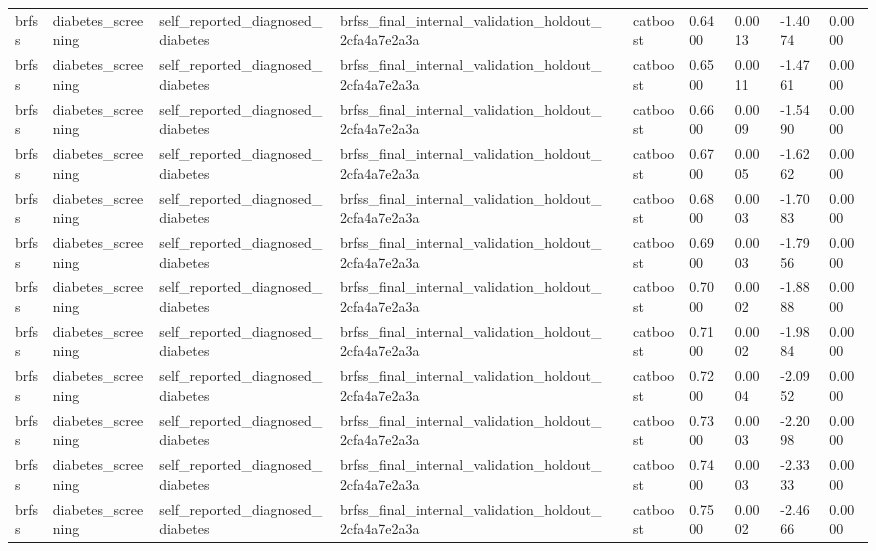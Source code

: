 \begin{tabular}{llllllllll}
brfss & diabetes\_screening & self\_reported\_diagnosed\_diabetes & brfss\_final\_internal\_validation\_holdout\_2cfa4a7e2a3a &  & catboost & 0.6400 & 0.0013 & -1.4074 & 0.0000 \\
brfss & diabetes\_screening & self\_reported\_diagnosed\_diabetes & brfss\_final\_internal\_validation\_holdout\_2cfa4a7e2a3a &  & catboost & 0.6500 & 0.0011 & -1.4761 & 0.0000 \\
brfss & diabetes\_screening & self\_reported\_diagnosed\_diabetes & brfss\_final\_internal\_validation\_holdout\_2cfa4a7e2a3a &  & catboost & 0.6600 & 0.0009 & -1.5490 & 0.0000 \\
brfss & diabetes\_screening & self\_reported\_diagnosed\_diabetes & brfss\_final\_internal\_validation\_holdout\_2cfa4a7e2a3a &  & catboost & 0.6700 & 0.0005 & -1.6262 & 0.0000 \\
brfss & diabetes\_screening & self\_reported\_diagnosed\_diabetes & brfss\_final\_internal\_validation\_holdout\_2cfa4a7e2a3a &  & catboost & 0.6800 & 0.0003 & -1.7083 & 0.0000 \\
brfss & diabetes\_screening & self\_reported\_diagnosed\_diabetes & brfss\_final\_internal\_validation\_holdout\_2cfa4a7e2a3a &  & catboost & 0.6900 & 0.0003 & -1.7956 & 0.0000 \\
brfss & diabetes\_screening & self\_reported\_diagnosed\_diabetes & brfss\_final\_internal\_validation\_holdout\_2cfa4a7e2a3a &  & catboost & 0.7000 & 0.0002 & -1.8888 & 0.0000 \\
brfss & diabetes\_screening & self\_reported\_diagnosed\_diabetes & brfss\_final\_internal\_validation\_holdout\_2cfa4a7e2a3a &  & catboost & 0.7100 & 0.0002 & -1.9884 & 0.0000 \\
brfss & diabetes\_screening & self\_reported\_diagnosed\_diabetes & brfss\_final\_internal\_validation\_holdout\_2cfa4a7e2a3a &  & catboost & 0.7200 & 0.0004 & -2.0952 & 0.0000 \\
brfss & diabetes\_screening & self\_reported\_diagnosed\_diabetes & brfss\_final\_internal\_validation\_holdout\_2cfa4a7e2a3a &  & catboost & 0.7300 & 0.0003 & -2.2098 & 0.0000 \\
brfss & diabetes\_screening & self\_reported\_diagnosed\_diabetes & brfss\_final\_internal\_validation\_holdout\_2cfa4a7e2a3a &  & catboost & 0.7400 & 0.0003 & -2.3333 & 0.0000 \\
brfss & diabetes\_screening & self\_reported\_diagnosed\_diabetes & brfss\_final\_internal\_validation\_holdout\_2cfa4a7e2a3a &  & catboost & 0.7500 & 0.0002 & -2.4666 & 0.0000 \\

\end{tabular}
